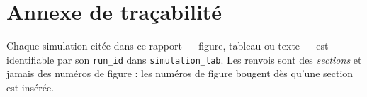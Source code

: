 \documentclass[11pt,a4paper]{article}
\newcommand{\code}[1]{\texttt{#1}}
\begin{document}
\appendix
\section{Annexe de traçabilité}
\label{sec:tracabilite}

Chaque simulation citée dans ce rapport --- figure, tableau ou texte --- est
identifiable par son \code{run\_id} dans \code{simulation\_lab}. Les renvois
sont des \emph{sections} et jamais des numéros de figure : les numéros de
figure bougent dès qu'une section est insérée.


\end{document}
